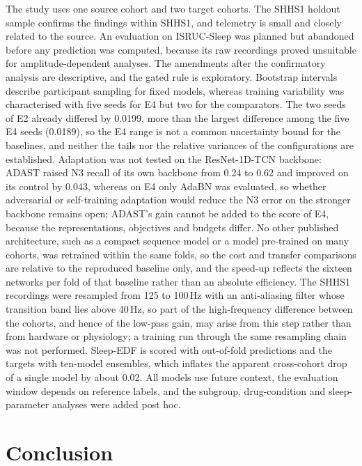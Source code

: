 \documentclass[11pt,a4paper]{article}
\begin{document}
The study uses one source cohort and two target cohorts. The SHHS1 holdout sample confirms the
findings within SHHS1, and telemetry is small and closely related to the source. An evaluation on
ISRUC-Sleep was planned but abandoned before any prediction was computed, because its raw recordings
proved unsuitable for amplitude-dependent analyses. The amendments after the confirmatory analysis
are descriptive, and the gated rule is exploratory. Bootstrap intervals describe participant sampling
for fixed models, whereas training variability was characterised with five seeds for E4 but two for
the comparators. The two seeds of E2 already differed by 0.0199, more than the largest difference
among the five E4 seeds (0.0189), so the E4 range is not a common uncertainty bound for the baselines,
and neither the tails nor the relative variances of the configurations are established. Adaptation
was not tested on the ResNet-1D-TCN backbone: ADAST raised N3 recall of its own backbone from 0.24 to
0.62 and improved on its control by 0.043, whereas on E4 only AdaBN was evaluated, so whether
adversarial or self-training adaptation would reduce the N3 error on the stronger backbone remains
open; ADAST's gain cannot be added to the score of E4, because the representations, objectives and
budgets differ. No other published architecture, such as a compact sequence model or a model
pre-trained on many cohorts, was retrained within the same folds, so the cost and transfer comparisons
are relative to the reproduced baseline only, and the speed-up reflects the sixteen networks per fold
of that baseline rather than an absolute efficiency. The SHHS1 recordings were resampled from 125 to
100\,Hz with an anti-aliasing filter whose transition band lies above 40\,Hz, so part of the
high-frequency difference between the cohorts, and hence of the low-pass gain, may arise from this
step rather than from hardware or physiology; a training run through the same resampling chain was not
performed. Sleep-EDF is scored with out-of-fold predictions and the targets with ten-model ensembles,
which inflates the apparent cross-cohort drop of a single model by about 0.02. All models use future
context, the evaluation window depends on reference labels, and the subgroup, drug-condition and
sleep-parameter analyses were added post hoc.

\section{Conclusion}
\end{document}

